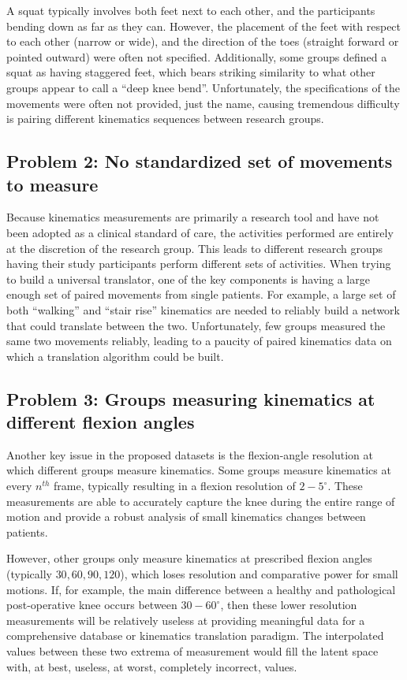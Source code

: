 A squat typically involves both feet next to each other, and the participants bending down as far as they can.
However, the placement of the feet with respect to each other (narrow or wide), and the direction of the toes (straight forward or pointed outward) were often not specified.
Additionally, some groups defined a squat as having staggered feet, which bears striking similarity to what other groups appear to call a ``deep knee bend''.
Unfortunately, the specifications of the movements were often not provided, just the name, causing tremendous difficulty is pairing different kinematics sequences between research groups.
\subsection{Problem 2: No standardized set of movements to measure}
Because kinematics measurements are primarily a research tool and have not been adopted as a clinical standard of care, the activities performed are entirely at the discretion of the research group.
This leads to different research groups having their study participants perform different sets of activities.
When trying to build a universal translator, one of the key components is having a large enough set of paired movements from single patients.
For example, a large set of both ``walking'' and ``stair rise'' kinematics are needed to reliably build a network that could translate between the two.
Unfortunately, few groups measured the same two movements reliably, leading to a paucity of paired kinematics data on which a translation algorithm could be built.

\subsection{Problem 3: Groups measuring kinematics at different flexion angles}
Another key issue in the proposed datasets is the flexion-angle resolution at which different groups measure kinematics.
Some groups measure kinematics at every $n^{th}$ frame, typically resulting in a flexion resolution of $2-5^{\circ}$.
These measurements are able to accurately capture the knee during the entire range of motion and provide a robust analysis of small kinematics changes between patients.

However, other groups only measure kinematics at prescribed flexion angles (typically $30,60,90,120$), which loses resolution and comparative power for small motions.
If, for example, the main difference between a healthy and pathological post-operative knee occurs between $30-60^{\circ}$, then these lower resolution measurements will be relatively useless at providing meaningful data for a comprehensive database or kinematics translation paradigm.
The interpolated values between these two extrema of measurement would fill the latent space with, at best, useless, at worst, completely
incorrect, values.

